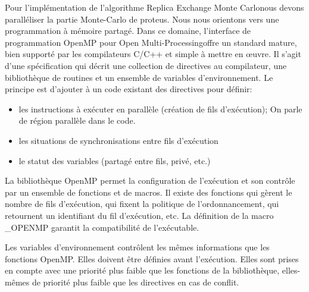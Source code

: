 Pour l'implémentation de l'algorithme \og Replica Exchange Monte Carlo\fg nous devons paralléliser la partie Monte-Carlo de proteus. Nous nous orientons vers une programmation à mémoire partagé. Dans ce domaine, l'interface de programmation OpenMP pour \og Open Multi-Processing\fg  offre un standard mature, bien supporté par les compilateurs C/C++ et simple à mettre en œuvre. Il s'agit d'une spécification qui décrit une collection de directives au compilateur, une bibliothèque de routines et un ensemble de variables d'environnement. Le principe est d'ajouter à un code existant des directives pour définir:
\begin{itemize}
\item les instructions à exécuter en parallèle (création de fils d'exécution); On parle de région parallèle dans le code.
\item les situations de synchronisations entre fils d'exécution
\item le statut des variables (partagé entre fils, privé, etc.) 
\end{itemize} 
La bibliothèque OpenMP permet la configuration de l'exécution et son contrôle par un ensemble de fonctions et de macros. Il existe des fonctions qui gèrent le nombre de fils d'exécution, qui fixent la politique de l'ordonnancement, qui retournent un identifiant du fil d'exécution, etc. La définition de la macro \_OPENMP garantit la compatibilité de l'exécutable.

Les variables d'environnement contrôlent les mêmes informations que les fonctions OpenMP. Elles doivent être définies avant l'exécution. Elles sont prises en compte avec une priorité plus faible que les fonctions de la bibliothèque, elles-mêmes de priorité plus faible que les directives en cas de conflit.

